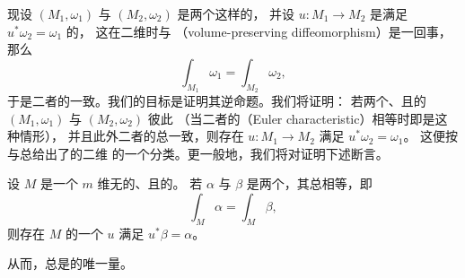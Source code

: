 现设 $(M_1,\omega_1)$ 与 $(M_2,\omega_2)$ 是两个这样的\trSurface，%
并设 $u:M_1\to M_2$ 是满足 $u^{*}\omega_2=\omega_1$ 的\trSymplecticDiffeomorphism，%
这在二维时与\textbf{\trVolumePreserving\trDiffeomorphism}%
（volume-preserving diffeomorphism）是一回事，那么
\begin{equation}\label{eq:equal-total-volumes}
\int_{M_1}\omega_1=\int_{M_2}\omega_2,
\end{equation}
于是二者的\trVolume{}一致。我们的目标是证明其逆命题。我们将证明：%
若两个\trCompact、\trConnected{}且\trOriented{}的\trSurface{} $(M_1,\omega_1)$ 与 $(M_2,\omega_2)$ 彼此\trDiffeomorphism%
（当二者的\textbf{\trEulerCharacteristic}（Euler characteristic）相等时即是这种情形），%
并且此外二者的总\trVolume{}一致，则存在\trDiffeomorphism{} $u:M_1\to M_2$%
满足 $u^{*}\omega_2=\omega_1$。%
这便按\trEulerCharacteristic{}与总\trVolume{}给出了\trCompact\trConnected{}的二维\trSymplecticManifold{}%
的一个分类。更一般地，我们将对\trVolumePreserving\trDiffeomorphism{}证明下述断言。

\begin{theorem}[\trMoser]\label{thm:moser}
设 $M$ 是一个 $m$ 维无\trBoundary{}的\trCompact、\trConnected{}且\trOriented{}的\trManifold。%
若 $\alpha$ 与 $\beta$ 是两个\trVolumeForm，其总\trVolume{}相等，即
\begin{equation}\label{eq:moser-volume-assumption}
\int_{M}\alpha=\int_{M}\beta,
\end{equation}
则存在 $M$ 的一个\trDiffeomorphism{} $u$ 满足 $u^{*}\beta=\alpha$。
\end{theorem}

从而，总\trVolume{}是\trVolumePreserving\trDiffeomorphism{}的唯一\trInvariant{}量。

